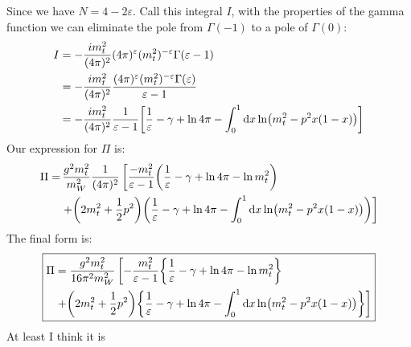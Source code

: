 \documentclass[12pt]{article}
\newcommand{\g}{\gamma}
\newcommand{\veps}{\varepsilon}
\begin{document}
Since we have $N=4-2\veps$. Call this integral $I$, with the properties of the gamma function we can eliminate the pole from $\Gamma(-1)$ to a pole of $\Gamma(0)$:
\begin{align*}
  I&=-\frac{im_t^2}{(4\pi)^2}(4\pi)^\veps(m_t^2)^{-\veps}\Gamma(\veps-1)\\
  &=-\frac{im_t^2}{(4\pi)^2}\frac{(4\pi)^\veps(m_t^2)^{-\veps}\Gamma(\veps)}
  {\veps-1}\\
  &=-\frac{im_t^2}{(4\pi)^2}\frac{1}{\veps-1}\qty[\frac1\veps-\g+\ln4\pi
  -\int_0^1\dd{x}\ln(m_t^2-p^2x(1-x))]
\end{align*}
Our expression for $\Pi$ is:
\begin{align*}
  \Pi=&\,\frac{g^2m_t^2}{m_W^2}\frac1{(4\pi)^2}
  \left[\frac{-m_t^2}{\veps-1}\qty(\frac1\veps-\g+\ln4\pi-\ln m_t^2)
    \right.\\ &\left. +\qty(2m_t^2+\frac12p^2)\qty(\frac1\veps-\g+\ln4\pi
  -\int_0^1\dd{x}\ln(m_t^2-p^2x(1-x)))\right]
\end{align*}
The final form is:
\begin{align*}
\boxed{
  \begin{aligned}
    \Pi&=\frac{g^2m_t^2}{16\pi^2m_W^2}\left[
      -\frac{m_t^2}{\veps-1}\qty{\frac1\veps-\g+\ln4\pi-\ln m_t^2}
    \right.\\
    &\left.+\qty(2m_t^2+\frac12p^2)
      \qty{\frac1\veps-\g+\ln4\pi-\int_0^1\dd{x}\ln(m_t^2-p^2x(1-x))}\right]
  \end{aligned}
  }
\end{align*}
At least I think it is
\end{document}
